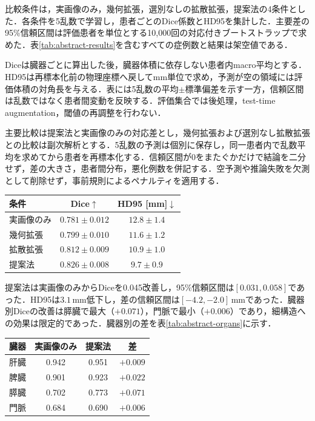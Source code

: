\AbstractPageBreak

比較条件は，実画像のみ，幾何拡張，選別なしの拡散拡張，提案法の4条件とした．各条件を5乱数で学習し，患者ごとのDice係数とHD95を集計した．主要差の95\%信頼区間は評価患者を単位とする10,000回の対応付きブートストラップで求めた．表\ref{tab:abstract-results}を含むすべての症例数と結果は架空値である．

Diceは臓器ごとに算出した後，臓器体積に依存しない患者内macro平均とする．HD95は再標本化前の物理座標へ戻してmm単位で求め，予測が空の領域には評価体積の対角長を与える．表には5乱数の平均$\pm$標準偏差を示す一方，信頼区間は乱数ではなく患者間変動を反映する．評価集合では後処理，test-time augmentation，閾値の再調整を行わない．

主要比較は提案法と実画像のみの対応差とし，幾何拡張および選別なし拡散拡張との比較は副次解析とする．5乱数の予測は個別に保存し，同一患者内で乱数平均を求めてから患者を再標本化する．信頼区間が0をまたぐかだけで結論を二分せず，差の大きさ，患者間分布，悪化例数を併記する．空予測や推論失敗を欠測として削除せず，事前規則によるペナルティを適用する．

\begin{center}
\small
\label{tab:abstract-results}
\begin{tabular}{lcc}
\toprule
条件 & Dice$\uparrow$ & HD95 [mm]$\downarrow$ \\
\midrule
実画像のみ & $0.781\pm0.012$ & $12.8\pm1.4$ \\
幾何拡張 & $0.799\pm0.010$ & $11.6\pm1.2$ \\
拡散拡張 & $0.812\pm0.009$ & $10.9\pm1.0$ \\
提案法 & $\mathbf{0.826\pm0.008}$ & $\mathbf{9.7\pm0.9}$ \\
\bottomrule
\end{tabular}
\end{center}

提案法は実画像のみからDiceを0.045改善し，95\%信頼区間は$[0.031,0.058]$であった．HD95は$3.1\,\mathrm{mm}$低下し，差の信頼区間は$[-4.2,-2.0]\,\mathrm{mm}$であった．臓器別Diceの改善は膵臓で最大（$+0.071$），門脈で最小（$+0.006$）であり，細構造への効果は限定的であった．臓器別の差を表\ref{tab:abstract-organs}に示す．

\begin{center}
\small
{}
\label{tab:abstract-organs}
\begin{tabular}{lccc}
\toprule
臓器 & 実画像のみ & 提案法 & 差 \\
\midrule
肝臓 & 0.942 & 0.951 & $+0.009$ \\
脾臓 & 0.901 & 0.923 & $+0.022$ \\
膵臓 & 0.702 & 0.773 & $+0.071$ \\
門脈 & 0.684 & 0.690 & $+0.006$ \\
\bottomrule
\end{tabular}
\end{center}

